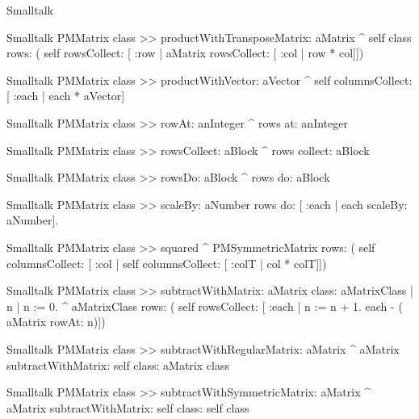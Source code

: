 \begin{displaycode}{Smalltalk}
\begin{displaycode}{Smalltalk}
PMMatrix class >> productWithTransposeMatrix: aMatrix
    ^ self class rows: ( self rowsCollect: [ :row | aMatrix 
                                    rowsCollect: [ :col | row * col]])
\end{displaycode}

\begin{displaycode}{Smalltalk}
PMMatrix class >> productWithVector: aVector
    ^ self columnsCollect: [ :each | each * aVector]
\end{displaycode}

\begin{displaycode}{Smalltalk}
PMMatrix class >> rowAt: anInteger
    ^ rows at: anInteger
\end{displaycode}

\begin{displaycode}{Smalltalk}
PMMatrix class >> rowsCollect: aBlock
    ^ rows collect: aBlock
\end{displaycode}

\begin{displaycode}{Smalltalk}
PMMatrix class >> rowsDo: aBlock
    ^ rows do: aBlock
\end{displaycode}

\begin{displaycode}{Smalltalk}
PMMatrix class >> scaleBy: aNumber
    rows do: [ :each | each scaleBy: aNumber].
\end{displaycode}

\begin{displaycode}{Smalltalk}
PMMatrix class >> squared
    ^ PMSymmetricMatrix rows: ( self columnsCollect: [ :col | self 
                               columnsCollect: [ :colT | col * colT]])
\end{displaycode}

\begin{displaycode}{Smalltalk}
PMMatrix class >> subtractWithMatrix: aMatrix class: aMatrixClass
    | n |
    n := 0.
    ^ aMatrixClass rows: ( self rowsCollect: [ :each | n := n + 1. 
                                          each - ( aMatrix rowAt: n)])
\end{displaycode}

\begin{displaycode}{Smalltalk}
PMMatrix class >> subtractWithRegularMatrix: aMatrix
    ^ aMatrix subtractWithMatrix: self class: aMatrix class
\end{displaycode}

\begin{displaycode}{Smalltalk}
PMMatrix class >> subtractWithSymmetricMatrix: aMatrix
    ^ aMatrix subtractWithMatrix: self class: self class
\end{displaycode}


\end{displaycode}
